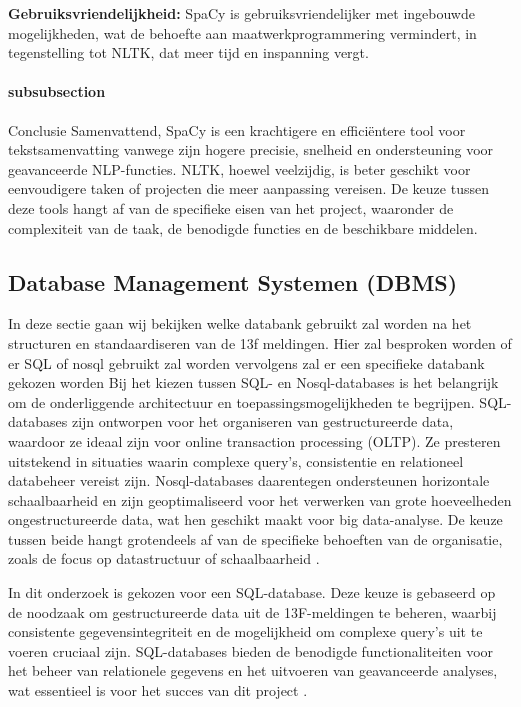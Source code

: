 \textbf{Gebruiksvriendelijkheid:} SpaCy is gebruiksvriendelijker met ingebouwde mogelijkheden, wat de behoefte aan maatwerkprogrammering vermindert, in tegenstelling tot NLTK, dat meer tijd en inspanning vergt.

\paragraph{subsubsection}{Conclusie}
Samenvattend, SpaCy is een krachtigere en efficiëntere tool voor tekstsamenvatting vanwege zijn hogere precisie, snelheid en ondersteuning voor geavanceerde NLP-functies. NLTK, hoewel veelzijdig, is beter geschikt voor eenvoudigere taken of projecten die meer aanpassing vereisen. De keuze tussen deze tools hangt af van de specifieke eisen van het project, waaronder de complexiteit van de taak, de benodigde functies en de beschikbare middelen.


\subsection{Database Management Systemen (DBMS)}
In deze sectie gaan wij bekijken welke databank gebruikt zal worden na het structuren en standaardiseren van de 13f meldingen. Hier zal besproken worden of er SQL of nosql gebruikt zal worden vervolgens zal er een specifieke databank gekozen worden
Bij het kiezen tussen SQL- en Nosql-databases is het belangrijk om de onderliggende architectuur en toepassingsmogelijkheden te begrijpen. SQL-databases zijn ontworpen voor het organiseren van gestructureerde data, waardoor ze ideaal zijn voor online transaction processing (OLTP). Ze presteren uitstekend in situaties waarin complexe query’s, consistentie en relationeel databeheer vereist zijn. Nosql-databases daarentegen ondersteunen horizontale schaalbaarheid en zijn geoptimaliseerd voor het verwerken van grote hoeveelheden ongestructureerde data, wat hen geschikt maakt voor big data-analyse. De keuze tussen beide hangt grotendeels af van de specifieke behoeften van de organisatie, zoals de focus op datastructuur of schaalbaarheid \autocite{khan2023performance}.

In dit onderzoek is gekozen voor een SQL-database. Deze keuze is gebaseerd op de noodzaak om gestructureerde data uit de 13F-meldingen te beheren, waarbij consistente gegevensintegriteit en de mogelijkheid om complexe query’s uit te voeren cruciaal zijn. SQL-databases bieden de benodigde functionaliteiten voor het beheer van relationele gegevens en het uitvoeren van geavanceerde analyses, wat essentieel is voor het succes van dit project \autocite{khan2023performance}.


